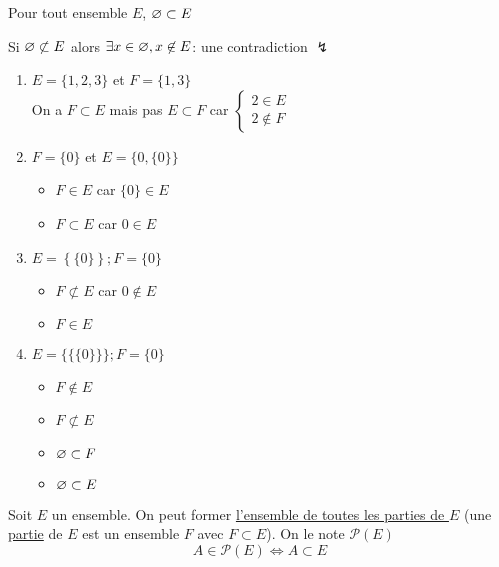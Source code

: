 \begin{prop}
	Pour tout ensemble $E$, $\varnothing \subset E$
\end{prop}

\begin{prv}
	Si $\varnothing \not\subset E$ alors $\exists x \in \varnothing, x \not\in E$: une contradiction $\lightning$ \\
\end{prv}

\begin{exm}
	\begin{enumerate}
		\item $E = \{1,2,3\}$ et $F = \{1,3\}$ \\
			On a $F \subset E$ mais pas $E \subset F$ car $\begin{cases}
				2 \in E\\
				2\not\in F
			\end{cases}$ 
		\item $F = \{0\}$ et $E = \{0, \{0\} \}$ \\
			\begin{itemize}
				\item  $F \in E$ car $\{0\} \in E$ 
				\item $F \subset  E$ car $0 \in E$
			\end{itemize}
		\item $E = \left\{ \{0\}  \right\}; F = \{0\}$ 
			\begin{itemize}
				\item $F \not\subset E$ car $0 \not\in E$
				\item $F \in E$
			\end{itemize}
		\item $E = \{\{\{0\} \} \}; F = \{0\}$ 
			\begin{itemize}
				\item $F\not\in E$
				\item $F\not\subset E$ 
				\item $\varnothing \subset F$ 
				\item $\varnothing\subset E$
			\end{itemize}
	\end{enumerate}
\end{exm}

\begin{defn}
	Soit $E$ un ensemble. On peut former \underline{l'ensemble de toutes les parties de $E$}
	(une \underline{partie} de $E$ est un ensemble $F$ avec $F\subset E$). On le note $\mathcal{P}(E)$\\
	\[
		A \in \mathcal{P}(E) \iff A \subset E
	\]
\end{defn}

